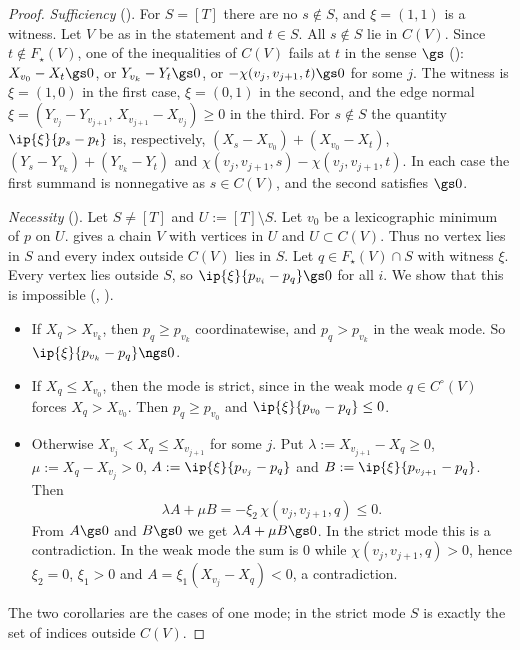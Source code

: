 \begin{proof}
\emph{Sufficiency} (). For $S=[T]$ there are no $s\notin S$, and $\xi=(1,1)$ is a witness. Let $V$ be as in the statement and $t\in S$. All $s\notin S$ lie in $C(V)$. Since $t\notin F_\star(V)$, one of the inequalities of $C(V)$ fails at $t$ in the sense $\gs$ (): $X_{v_0}-X_t\gs0$, or $Y_{v_k}-Y_t\gs0$, or $-\chi(v_j,v_{j+1},t)\gs0$ for some $j$. The witness is $\xi=(1,0)$ in the first case, $\xi=(0,1)$ in the second, and the edge normal $\xi=(Y_{v_j}-Y_{v_{j+1}},\,X_{v_{j+1}}-X_{v_j})\ge0$ in the third. For $s\notin S$ the quantity $\ip{\xi}{p_s-p_t}$ is, respectively, $(X_s-X_{v_0})+(X_{v_0}-X_t)$, $(Y_s-Y_{v_k})+(Y_{v_k}-Y_t)$ and $\chi(v_j,v_{j+1},s)-\chi(v_j,v_{j+1},t)$. In each case the first summand is nonnegative as $s\in C(V)$, and the second satisfies $\gs0$.

\emph{Necessity} (). Let $S\ne[T]$ and $U:=[T]\setminus S$. Let $v_0$ be a lexicographic minimum of $p$ on $U$.  gives a chain $V$ with vertices in $U$ and $U\subset C(V)$. Thus no vertex lies in $S$ and every index outside $C(V)$ lies in $S$. Let $q\in F_\star(V)\cap S$ with witness $\xi$. Every vertex lies outside $S$, so $\ip{\xi}{p_{v_i}-p_q}\gs0$ for all $i$. We show that this is impossible (, ).
\begin{itemize}
\item If $X_q>X_{v_k}$, then $p_q\ge p_{v_k}$ coordinatewise, and $p_q>p_{v_k}$ in the weak mode. So $\ip{\xi}{p_{v_k}-p_q}\ngs0$.
\item If $X_q\le X_{v_0}$, then the mode is strict, since in the weak mode $q\in C^\circ(V)$ forces $X_q>X_{v_0}$. Then $p_q\ge p_{v_0}$ and $\ip{\xi}{p_{v_0}-p_q}\le0$.
\item Otherwise $X_{v_j}<X_q\le X_{v_{j+1}}$ for some $j$. Put $\lambda:=X_{v_{j+1}}-X_q\ge0$, $\mu:=X_q-X_{v_j}>0$, $A:=\ip{\xi}{p_{v_j}-p_q}$ and $B:=\ip{\xi}{p_{v_{j+1}}-p_q}$. Then
\[
\lambda A+\mu B=-\xi_2\,\chi(v_j,v_{j+1},q)\le0 .
\]
From $A\gs0$ and $B\gs0$ we get $\lambda A+\mu B\gs0$. In the strict mode this is a contradiction. In the weak mode the sum is $0$ while $\chi(v_j,v_{j+1},q)>0$, hence $\xi_2=0$, $\xi_1>0$ and $A=\xi_1(X_{v_j}-X_q)<0$, a contradiction.
\end{itemize}
The two corollaries are the cases of one mode; in the strict mode $S$ is exactly the set of indices outside $C(V)$.
\end{proof}

